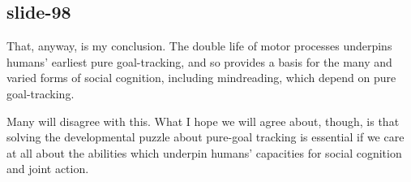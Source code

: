 \documentclass[12pt,\papersize]{extarticle}
\begin{document}
\subsection{slide-98}
That, anyway, is my conclusion.
The double life of motor processes underpins humans’ earliest 
pure goal-tracking, and so provides a basis for the many and varied forms of social cognition,
including mindreading, which depend on pure goal-tracking.
 
Many will disagree with this.
What I hope we will agree about, though, is that solving the developmental puzzle
about pure-goal tracking is essential if we care at all about the abilities
which underpin humans’ capacities for social cognition and joint action.
 

    







\end{document}
